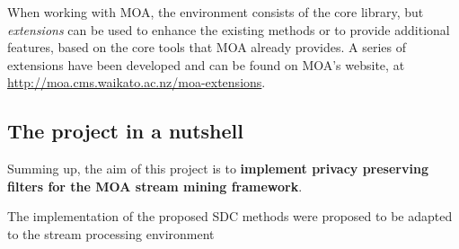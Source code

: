 When working with MOA, the environment consists of the core library, but \textit{extensions}
can be used to enhance the existing methods or to provide additional features, based on
the core tools that MOA already provides. A series of extensions have been developed and can
be found on MOA's website, at \url{http://moa.cms.waikato.ac.nz/moa-extensions}.

\subsection{The project in a nutshell}

Summing up, the aim of this project is to \textbf{implement privacy preserving filters
for the MOA stream mining framework}.

The implementation of the proposed SDC methods were proposed to be adapted to the stream processing environment